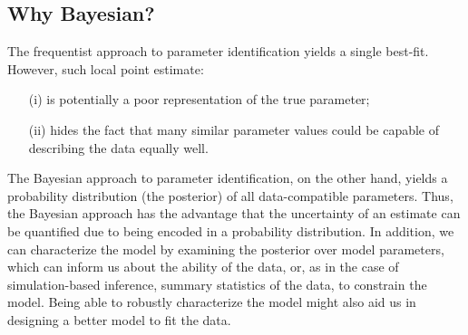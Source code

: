 \subsection{Why Bayesian?} 

The frequentist approach to parameter identification yields a single best-fit. However, such local point estimate: 
\vspace{-0.5mm}
\begin{itemize}
    \item[(i)] is potentially a poor representation of the true parameter;
    \item[(ii)] hides the fact that many similar parameter values could be capable of describing the data equally well.
\end{itemize}

The Bayesian approach to parameter identification, on the other hand, yields a probability distribution (the posterior) of all data-compatible parameters. Thus, the Bayesian approach has the advantage that the uncertainty of an estimate can be quantified due to being encoded in a probability distribution. In addition, we can characterize the model by examining the posterior over model parameters, which can inform us about the ability of the data, or, as in the case of simulation-based inference, summary statistics of the data, to constrain the model. Being able to robustly characterize the model might also aid us in designing a better model to fit the data.


